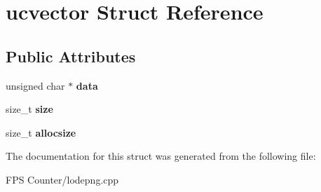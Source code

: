 \hypertarget{structucvector}{}\section{ucvector Struct Reference}
\label{structucvector}
\subsection*{Public Attributes}
\begin{DoxyCompactItemize}
\item 
\mbox{\label{structucvector_ace794c5713208c5a20f21762cd87c919}} 
unsigned char $\ast$ {\bfseries data}
\item 
\mbox{\label{structucvector_a27c99c34de0c5b3ca0c242d402c69499}} 
size\+\_\+t {\bfseries size}
\item 
\mbox{\label{structucvector_a235168baac13f0c78bd3e309dc170f90}} 
size\+\_\+t {\bfseries allocsize}
\end{DoxyCompactItemize}


The documentation for this struct was generated from the following file\+:\begin{DoxyCompactItemize}
\item 
F\+P\+S Counter/lodepng.\+cpp\end{DoxyCompactItemize}
